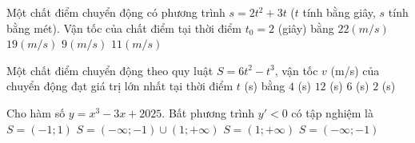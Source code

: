 \begin{ex}%
	Một chất điểm chuyển động có phương trình $s=2t^2+3t$ ($t$ tính bằng giây, $s$ tính bằng mét). Vận tốc của chất điểm tại  thời điểm $t_0=2$ (giây) bằng
	\choice 
		 {$22\left(m/s\right)$}
		{$19\left(m/s\right)$} 
		 {$9\left(m/s\right)$}
		{\True$11\left(m/s\right)$} 
\end{ex}

\begin{ex}%
	Một chất điểm chuyển động theo quy luật  $S=6t^{2}-t^{3}$, vận tốc $v$ (m/s) của chuyển động đạt giá trị lớn nhất tại thời điểm $t$ (s) bằng
	 \choice
		{$4$ (s)} 
		{$12$  (s)}
		 {$6$ (s)}
		 {\True $2$ (s)}
\end{ex}

\begin{ex}%
	Cho hàm số $y=x^3-3x+2025$. Bất phương trình  $y'<0$ có tập nghiệm là
	\choice 
		{\True $S=(-1;1)$} 
		 {$S=(-\infty;-1)\cup(1;+\infty)$}
		{$S=(1;+\infty)$} 
		{$S=(-\infty;-1)$} 
\end{ex}


